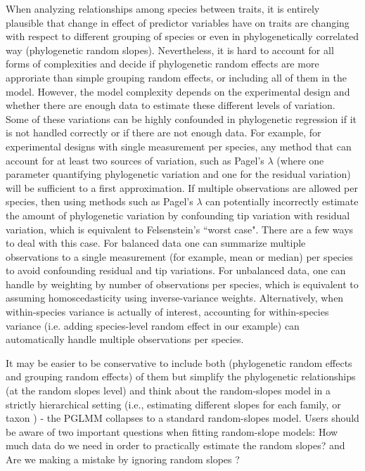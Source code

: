 \documentclass[12pt]{article}
\begin{document}
When analyzing relationships among species between traits, it is entirely plausible that change in effect of predictor variables have on traits are changing with respect to different grouping of species or even in phylogenetically correlated way (phylogenetic random slopes).
Nevertheless, it is hard to account for all forms of complexities and decide if phylogenetic random effects are more approriate than simple grouping random effects, or including all of them in the model.
However, the model complexity depends on the experimental design and whether there are enough data to estimate these different levels of variation.
Some of these variations can be highly confounded in phylogenetic regression if it is not handled correctly or if there are not enough data.
For example, for experimental designs with single measurement per species, any method that can account for at least two sources of variation, such as Pagel's $\lambda$ (where one parameter quantifying phylogenetic variation and one for the residual variation) will be sufficient to a first approximation.
If multiple observations are allowed per species, then using methods such as Pagel's $\lambda$ can potentially incorrectly estimate the amount of phylogenetic variation by confounding tip variation with residual variation, which is equivalent to Felsenstein's ``worst case".
There are a few ways to deal with this case.
For balanced data one can summarize multiple observations to a single measurement (for example, mean or median) per species to avoid confounding residual and tip variations.
For unbalanced data, one can handle by weighting by number of observations per species, which is equivalent to assuming homoscedasticity using inverse-variance weights. 
Alternatively, when within-species variance is actually of interest, accounting for within-species variance (i.e. adding species-level random effect in our example) can automatically handle multiple observations per species.

It may be easier to be conservative to include both (phylogenetic random effects and grouping random effects) of them but simplify the phylogenetic relationships (at the random slopes level) and think about the random-slopes model in a strictly hierarchical setting (i.e., estimating different slopes for each family, or taxon \citep{bunnefeld2012island}) - the PGLMM collapses to a standard random-slopes model. 
Users should be aware of two important questions when fitting random-slope models: How much data do we need in order to practically estimate the random slopes? and Are we making a mistake by ignoring random slopes \citep{schielzeth2008conclusions}? 
\end{document}
